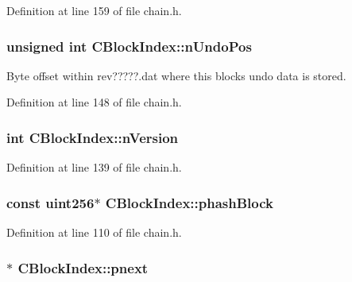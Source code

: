 Definition at line 159 of file chain.\+h.

\hypertarget{class_c_block_index_a865ddd56406c23e98cdc61511a61eb64}{}
\subsubsection[{n\+Undo\+Pos}]{\setlength{\rightskip}{0pt plus 5cm}unsigned int C\+Block\+Index\+::n\+Undo\+Pos}\label{class_c_block_index_a865ddd56406c23e98cdc61511a61eb64}


Byte offset within rev?????.dat where this block\textquotesingle{}s undo data is stored. 



Definition at line 148 of file chain.\+h.

\hypertarget{class_c_block_index_a45126301a0a6e26010527a7bbfc1ef58}{}
\subsubsection[{n\+Version}]{\setlength{\rightskip}{0pt plus 5cm}int C\+Block\+Index\+::n\+Version}\label{class_c_block_index_a45126301a0a6e26010527a7bbfc1ef58}


Definition at line 139 of file chain.\+h.

\hypertarget{class_c_block_index_afac8099e03ffda463c7153ca82d37b66}{}
\subsubsection[{phash\+Block}]{\setlength{\rightskip}{0pt plus 5cm}const {\bf uint256}$\ast$ C\+Block\+Index\+::phash\+Block}\label{class_c_block_index_afac8099e03ffda463c7153ca82d37b66}


Definition at line 110 of file chain.\+h.

\hypertarget{class_c_block_index_a2f0acd342accaab731d887584b444590}{}
\subsubsection[{pnext}]{$\ast$ C\+Block\+Index\+::pnext}\label{class_c_block_index_a2f0acd342accaab731d887584b444590}


